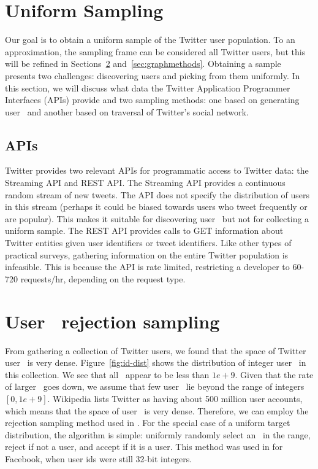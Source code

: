 \section{Uniform Sampling}
\label{sec:sampling}

Our goal is to obtain a uniform sample of the Twitter user population. To an
approximation, the sampling frame can be considered all Twitter users, but this
will be refined in Sections~\ref{sec:idsampling}
and~\ref{sec:graphmethods}. Obtaining a sample presents two
challenges: discovering users and picking from them uniformly. In this section, we will discuss what data the Twitter Application Programmer Interfaces (APIs) provide and two sampling methods: one based on generating user \ids~and another based on traversal of Twitter's social network.


\subsection{APIs}

Twitter provides two relevant APIs for programmatic access to Twitter data: the
Streaming API and REST API. The Streaming API provides a continuous random
stream of new tweets. The API does not specify the distribution of users
in this stream (perhaps it could be biased towards users who tweet
frequently or are popular). This makes it suitable for discovering user
\ids~but not for collecting a uniform sample. The REST API provides calls to
GET information about Twitter entities given user identifiers or tweet
identifiers. Like other types of practical surveys, gathering information on
the entire Twitter population is infeasible. This is because the API is rate
limited, restricting a developer to 60-720 requests/hr, depending on the
request type. 

\section{User \id~rejection sampling}
\label{sec:idsampling}

From gathering a collection of Twitter users, we found that the space
of Twitter user \ids~is very dense.  Figure~\ref{fig:id-dist} shows
the distribution of integer user \ids~in this collection. We see that
all \ids~appear to be less than $1e+9$. Given that the rate of larger
\ids~goes down, we assume that few user \ids~lie beyond the range of
integers $[0,1e+9]$. Wikipedia lists Twitter as having about 500
million user accounts, which means that the space of user \ids~is very
dense.  Therefore, we can employ the rejection sampling method used in
\cite{Minas:2009}. For the special case of a uniform target
distribution, the algorithm is simple: uniformly randomly select an
\id~in the range, reject if not a user, and accept if it is a user.
This method was used in \cite{Minas:2009} for Facebook, when user ids
were still 32-bit integers.

